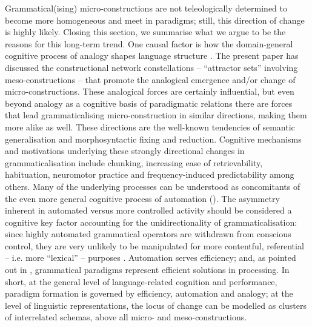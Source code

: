 \documentclass[output=paper]{langsci/langscibook}
\begin{document}
Grammatical(ising) micro\hyp{}constructions are not teleologically determined to become more homogeneous and meet in paradigms; still, this direction of change is highly likely. Closing this section, we summarise what we argue to be the reasons for this long-term trend. One causal factor is how the domain-general cognitive process of analogy shapes language structure \citep[e.g.][]{AntillaAnalogywarpwoof2003}. The present paper has discussed the constructional network constellations – “attractor sets” involving meso\hyp{}constructions – that promote the analogical emergence and/or change of micro\hyp{}constructions. These analogical forces are certainly influential, but even beyond analogy as a cognitive basis of paradigmatic relations there are forces that lead grammaticalising micro-construction in similar directions, making them more alike as well. These directions are the well-known tendencies of semantic generalisation and morphosyntactic fixing and reduction. Cognitive mechanisms and motivations underlying these strongly directional changes in grammaticalisation include chunking, increasing ease of retrievability, habituation, neuromotor practice and frequency-induced predictability among others. Many of the underlying processes can be understood as concomitants of the even more general cognitive process of automation (\citealt{BybeeLanguageUsageCognition2010, NeelsRefiningfrequencyeffectexplanations2020}). The asymmetry inherent in automated versus more controlled activity should be considered a cognitive key factor accounting for the unidirectionality of grammaticalisation: since highly automated grammatical operators are withdrawn from conscious control, they are very unlikely to be manipulated for more contentful, referential – i.e. more “lexical” – purposes \citep[cf.][]{LehmannGrammaticalizationautomation2017, HaspelmathWhygrammaticalizationirreversible1999}. Automation serves efficiency; and, as pointed out in , grammatical paradigms represent efficient solutions in processing. In short, at the general level of language\hyp{}related cognition and performance, paradigm formation is governed by efficiency, automation and analogy; at the level of linguistic representations, the locus of change can be modelled as clusters of interrelated schemas, above all micro- and meso\hyp{}constructions.
\end{document}
